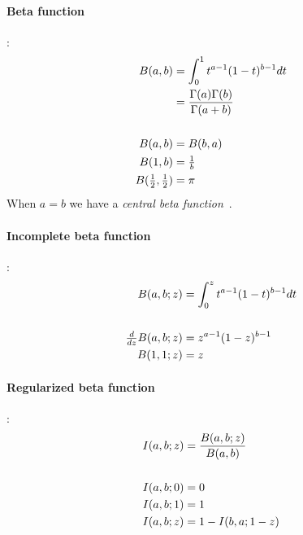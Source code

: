 \paragraph*{Beta function}\hspace{-0.8em}\cite{Abramowitz1965}:%
%
\begin{align*}
B(a,b) & 
= \int_0^1 t^{a-1}(1-t)^{b-1} dt						
\\ &= \frac{\Gamma(a)\Gamma(b)}{\Gamma(a+b)}		
\\
\\ B(a,b) & = B(b,a) 								
\\ B(1, b) &= \tfrac{1}{b}							
\\ B(\tfrac{1}{2}, \tfrac{1}{2}) &= \pi					
\end{align*}
When $a=b$ we have a {\em central beta function}~\cite{Borwein1992a}.


\paragraph*{Incomplete beta function}\hspace{-0.8em}\cite{Abramowitz1965}:%
%
%
\begin{align*}
B(a,b;z) & = \int_0^z t^{a-1} (1-t)^{b-1} dt 							
\\
\\
\tfrac{d}{dz} B(a,b;z) & = z^{a-1} (1-z)^{b-1} 			 \\
B(1,1;z) & = z										
\end{align*}	




\paragraph*{Regularized beta function}\hspace{-0.8em}\cite{Abramowitz1965}:%
\label{RegBeta}
\begin{align*}
I(a,b;z) & = \frac{B(a,b;z)}{B(a,b)}				
\\
\\ I(a,b;0) & = 0 							
\\ I(a,b;1) & = 1 							
\\ I(a,b;z) & = 1 - I(b,a;1-z)					
\end{align*}





